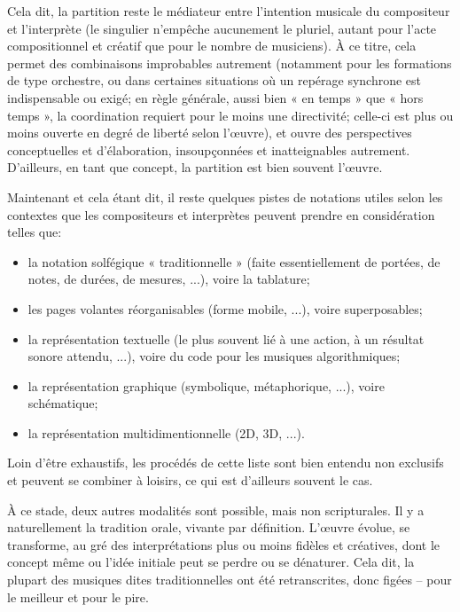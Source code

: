 \documentclass{article}
\begin{document}
Cela dit, la partition reste le médiateur entre l'intention musicale du compositeur et l'interprète (le singulier n'empêche aucunement le pluriel, autant pour l'acte compositionnel et créatif que pour le nombre de musiciens). À ce titre, cela permet des combinaisons improbables autrement (notamment pour les formations de type orchestre, ou dans certaines situations où un repérage synchrone est indispensable ou exigé; en règle générale, aussi bien « en temps » que « hors temps », la coordination requiert pour le moins une directivité; celle-ci est plus ou moins ouverte en degré de liberté selon l'œuvre), et ouvre des perspectives conceptuelles et d'élaboration, insoupçonnées et inatteignables autrement. D'ailleurs, en tant que concept, la partition est bien souvent l'œuvre.  

\bigskip

Maintenant et cela étant dit, il reste quelques pistes de notations utiles selon les contextes que les compositeurs et interprètes peuvent prendre en considération telles que:

\begin{itemize}
\item la notation solfégique « traditionnelle » (faite essentiellement de portées, de notes, de durées, de mesures, ...), voire la tablature;
\item les pages volantes réorganisables  (forme mobile, ...), voire superposables;
\item la représentation textuelle (le plus souvent lié à une action, à un résultat sonore attendu, ...), voire du code pour les musiques algorithmiques;
\item la représentation graphique (symbolique, métaphorique, ...), voire schématique;
\item la représentation multidimentionnelle (2D, 3D, ...).
\end{itemize}

Loin d'être exhaustifs, les procédés de cette liste sont bien entendu non exclusifs et peuvent se combiner à loisirs, ce qui est d'ailleurs souvent le cas.


\bigskip

À ce stade, deux autres modalités sont possible, mais non scripturales. Il y a naturellement la tradition orale, vivante par définition.  L'œuvre évolue, se transforme, au gré des interprétations plus ou moins fidèles et créatives, dont le concept même ou l'idée initiale peut se perdre ou se dénaturer. Cela dit, la plupart des musiques dites traditionnelles ont été retranscrites, donc figées -- pour le meilleur et pour le pire. 
\end{document}
